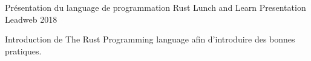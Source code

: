 \begin{cventries}
  \cventry
    {Présentation du language de programmation Rust}
    {Lunch and Learn Presentation}
    {Leadweb}
    {2018}
    {
      \begin{cvitems}
        \item {Introduction de The Rust Programming language afin d'introduire des bonnes pratiques.}
      \end{cvitems}
    }
\end{cventries}
\vspace{10mm}
